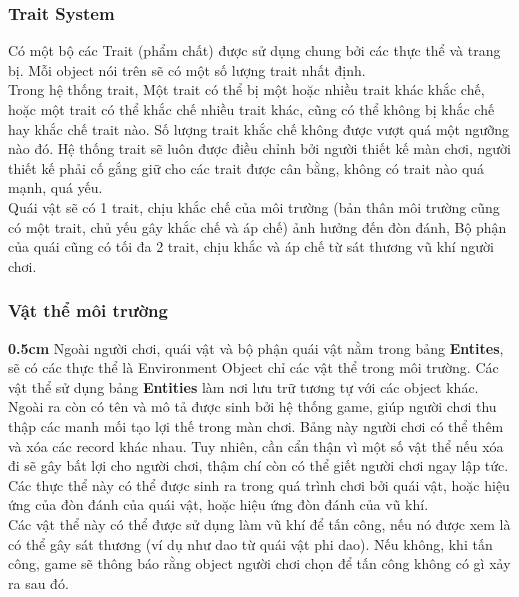 \subsubsection{Trait System}
\hspace*{0.5cm} Có một bộ các Trait (phẩm chất) được sử dụng chung bởi các thực thể và trang bị. Mỗi object nói trên sẽ có một số lượng trait nhất định.\\
\hspace*{0.5cm} Trong hệ thống trait, Một trait có thể bị một hoặc nhiều trait khác khắc chế, hoặc một trait có thể khắc chế nhiều trait khác, cũng có thể không bị khắc chế hay khắc chế trait nào. Số lượng trait khắc chế không được vượt quá một ngưỡng nào đó. Hệ thống trait sẽ luôn được điều chỉnh bởi người thiết kế màn chơi, người thiết kế phải cố gắng giữ cho các trait được cân bằng, không có trait nào quá mạnh, quá yếu.\\ 
\hspace*{0.5cm} Quái vật sẽ có 1 trait, chịu khắc chế của môi trường (bản thân môi trường cũng có một trait, chủ yếu gây khắc chế và áp chế) ảnh hưởng đến đòn đánh, Bộ phận của quái cũng có tối đa 2 trait, chịu khắc và áp chế từ sát thương vũ khí người chơi.

\subsubsection{Vật thể môi trường}

\textbf{0.5cm} Ngoài người chơi, quái vật và bộ phận quái vật nằm trong bảng \textbf{Entites}, sẽ có các thực thể là Environment Object chỉ các vật thể trong môi trường. Các vật thể sử dụng bảng \textbf{Entities} làm nơi lưu trữ tương tự với các object khác. Ngoài ra còn có tên và mô tả được sinh bởi hệ thống game, giúp người chơi thu thập các manh mối tạo lợi thế trong màn chơi. Bảng này người chơi có thể thêm và xóa các record khác nhau. Tuy nhiên, cần cẩn thận vì một số vật thể nếu xóa đi sẽ gây bất lợi cho người chơi, thậm chí còn có thể giết người chơi ngay lập tức. Các thực thể này có thể được sinh ra trong quá trình chơi bởi quái vật, hoặc hiệu ứng của đòn đánh của quái vật, hoặc hiệu ứng đòn đánh của vũ khí.\\

\hspace*{0.5cm} Các vật thể này có thể được sử dụng làm vũ khí để tấn công, nếu nó được xem là có thể gây sát thương (ví dụ như dao từ quái vật phi dao). Nếu không, khi tấn công, game sẽ thông báo rằng object người chơi chọn để tấn công không có gì xảy ra sau đó.\\

